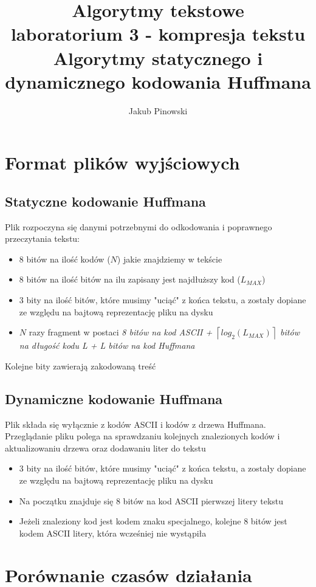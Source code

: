 \documentclass{article}
\title{
	Algorytmy tekstowe\\
	\large laboratorium 3 - kompresja tekstu\\Algorytmy statycznego i dynamicznego kodowania Huffmana
}
\author{Jakub Pinowski}
\date{}
\begin{document}
\maketitle
\section{Format plików wyjściowych}
	\subsection{Statyczne kodowanie Huffmana}
		Plik rozpoczyna się danymi potrzebnymi do odkodowania i poprawnego przeczytania tekstu:
		\begin{itemize}
		\item 8 bitów na ilość kodów (\(N\)) jakie znajdziemy w tekście
		\item 8 bitów na ilość bitów na ilu zapisany jest najdłuższy kod (\(L_{MAX}\))
		\item 3 bity na ilość bitów, które musimy "uciąć" z końca tekstu, a zostały dopiane ze względu na bajtową reprezentację pliku na dysku
		\item \(N\) razy fragment w postaci \textit{8 bitów na kod ASCII + \(\left \lceil{log_2(L_{MAX})}\right \rceil\) bitów na długość kodu L + L bitów na kod Huffmana}
		\end{itemize}
		Kolejne bity zawierają zakodowaną treść
	\subsection{Dynamiczne kodowanie Huffmana}
		Plik składa się wyłącznie z kodów ASCII i kodów z drzewa Huffmana. Przeglądanie pliku polega na sprawdzaniu kolejnych znalezionych kodów i aktualizowaniu drzewa oraz dodawaniu liter do tekstu 
		\begin{itemize}
		\item 3 bity na ilość bitów, które musimy "uciąć" z końca tekstu, a zostały dopiane ze względu na bajtową reprezentację pliku na dysku
		\item Na początku znajduje się 8 bitów na kod ASCII pierwszej litery tekstu
		\item Jeżeli znaleziony kod jest kodem znaku specjalnego, kolejne 8 bitów jest kodem ASCII litery, która wcześniej nie wystąpiła
		\end{itemize}
\section{Porównanie czasów działania}
\end{document}
